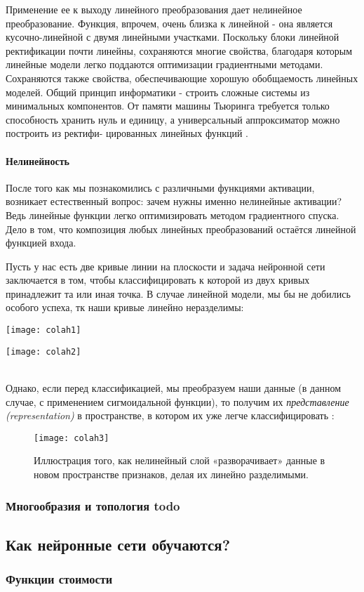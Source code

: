 Применение ее к выходу линейного преобразования дает нелинейное преобразование. 
Функция, впрочем, очень близка
к линейной - она является кусочно-линейной с двумя линейными участками. 
Поскольку блоки линейной ректификации почти линейны, сохраняются
многие свойства, благодаря которым линейные модели легко поддаются
оптимизации градиентными методами. Сохраняются также свойства, обес­печивающие 
хорошую обобщаемость линейных моделей. Общий принцип
информатики - строить сложные системы из минимальных компонентов.
От памяти машины Тьюринга требуется только способность хранить нуль
и единицу, а универсальный аппроксиматор можно построить из ректифи-
цированных линейных функций \cite{Goodfellow-et-al-2016}.

\paragraph{Нелинейность}

После того как мы познакомились с различными функциями активации, 
возникает естественный вопрос: зачем нужны именно нелинейные активации? 
Ведь линейные функции легко оптимизировать методом градиентного спуска. 
Дело в том, что композиция любых линейных преобразований остаётся линейной 
функцией входа. 

Пусть у нас есть две кривые линии на плоскости и задача нейронной сети заключается в том, 
чтобы классифицировать к которой из двух кривых принадлежит та или иная точка. В случае 
линейной модели, мы бы не добились особого успеха, тк наши кривые линейно неразделимы:\\

\begin{minipage}{0.35\textwidth}
    \texttt{[image: colah1]}
    \label{fig:colah1}
\end{minipage}
\hspace{80pt}
\begin{minipage}{0.35\textwidth}
    \texttt{[image: colah2]}
    \label{fig:colah2}
\end{minipage}\\

Однако, если перед классификацией, мы преобразуем наши данные 
(в данном случае, с применением сигмоидальной функции), 
то получим их \textit{представление (representation)} в 
пространстве, в котором их уже легче классифицировать \cite{colah}:

\begin{figure}[h!]
    \centering
    \texttt{[image: colah3]}
    \caption{Иллюстрация того, как нелинейный слой «разворачивает» 
    данные в новом пространстве признаков, делая их линейно разделимыми.}
    \label{fig:colah3}
\end{figure}

\subsubsection{Многообразия и топология {\color{red} todo}}


\subsection{Как нейронные сети обучаются?}

\subsubsection{Функции стоимости}

